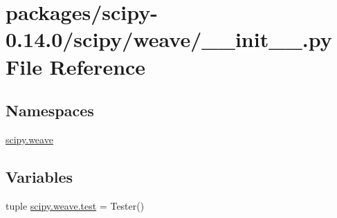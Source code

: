 \hypertarget{packages_2scipy-0_814_80_2scipy_2weave_2____init_____8py}{}\section{packages/scipy-\/0.14.0/scipy/weave/\+\_\+\+\_\+init\+\_\+\+\_\+.py File Reference}
\label{packages_2scipy-0_814_80_2scipy_2weave_2____init_____8py}
\subsection*{Namespaces}
\begin{DoxyCompactItemize}
\item 
 \hyperlink{namespacescipy_1_1weave}{scipy.\+weave}
\end{DoxyCompactItemize}
\subsection*{Variables}
\begin{DoxyCompactItemize}
\item 
tuple \hyperlink{namespacescipy_1_1weave_a904d48ea68578c1d6a80c0fd080d04df}{scipy.\+weave.\+test} = Tester()
\end{DoxyCompactItemize}
